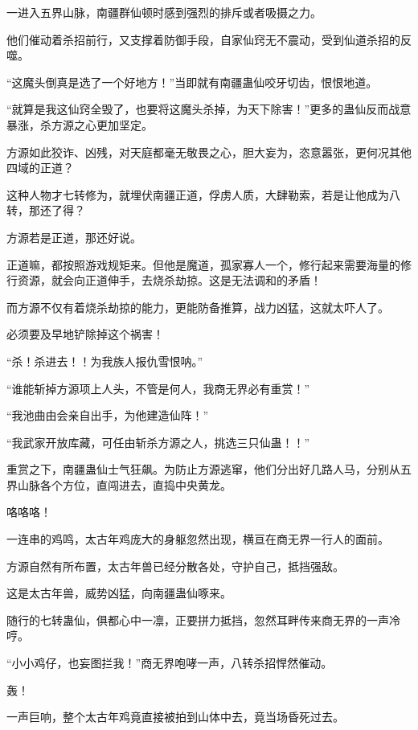 
\begin{this_body}



一进入五界山脉，南疆群仙顿时感到强烈的排斥或者吸摄之力。

他们催动着杀招前行，又支撑着防御手段，自家仙窍无不震动，受到仙道杀招的反噬。

“这魔头倒真是选了一个好地方！”当即就有南疆蛊仙咬牙切齿，恨恨地道。

“就算是我这仙窍全毁了，也要将这魔头杀掉，为天下除害！”更多的蛊仙反而战意暴涨，杀方源之心更加坚定。

方源如此狡诈、凶残，对天庭都毫无敬畏之心，胆大妄为，恣意嚣张，更何况其他四域的正道？

这种人物才七转修为，就埋伏南疆正道，俘虏人质，大肆勒索，若是让他成为八转，那还了得？

方源若是正道，那还好说。

正道嘛，都按照游戏规矩来。但他是魔道，孤家寡人一个，修行起来需要海量的修行资源，就会向正道伸手，去烧杀劫掠。这是无法调和的矛盾！

而方源不仅有着烧杀劫掠的能力，更能防备推算，战力凶猛，这就太吓人了。

必须要及早地铲除掉这个祸害！

“杀！杀进去！！为我族人报仇雪恨呐。”

“谁能斩掉方源项上人头，不管是何人，我商无界必有重赏！”

“我池曲由会亲自出手，为他建造仙阵！”

“我武家开放库藏，可任由斩杀方源之人，挑选三只仙蛊！！”

重赏之下，南疆蛊仙士气狂飙。为防止方源逃窜，他们分出好几路人马，分别从五界山脉各个方位，直闯进去，直捣中央黄龙。

咯咯咯！

一连串的鸡鸣，太古年鸡庞大的身躯忽然出现，横亘在商无界一行人的面前。

方源自然有所布置，太古年兽已经分散各处，守护自己，抵挡强敌。

这是太古年兽，威势凶猛，向南疆蛊仙啄来。

随行的七转蛊仙，俱都心中一凛，正要拼力抵挡，忽然耳畔传来商无界的一声冷哼。

“小小鸡仔，也妄图拦我！”商无界咆哮一声，八转杀招悍然催动。

轰！

一声巨响，整个太古年鸡竟直接被拍到山体中去，竟当场昏死过去。


\end{this_body}
